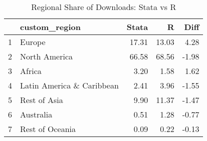 \begin{table}[ht]
\centering
\begin{tabular}{rlrrr}
  \hline
 & custom\_region & Stata & R & Diff \\ 
  \hline
1 & Europe & 17.31 & 13.03 & 4.28 \\ 
  2 & North America & 66.58 & 68.56 & -1.98 \\ 
  3 & Africa & 3.20 & 1.58 & 1.62 \\ 
  4 & Latin America \& Caribbean & 2.41 & 3.96 & -1.55 \\ 
  5 & Rest of Asia & 9.90 & 11.37 & -1.47 \\ 
  6 & Australia & 0.51 & 1.28 & -0.77 \\ 
  7 & Rest of Oceania & 0.09 & 0.22 & -0.13 \\ 
   \hline
\end{tabular}
\caption{Regional Share of Downloads: Stata vs R} 
\label{tab:region_compare}
\end{table}
